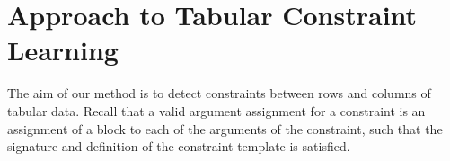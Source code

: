 %







\newcommand{\tcl}{Tabular Constraint Learning}
\section{Approach to Tabular Constraint Learning}\label{sec:approach}
The aim of our method is to detect constraints between rows and columns of tabular data. Recall that a valid argument assignment for a constraint is an assignment of a block to each of the arguments of the constraint, such that the signature and definition of the constraint template is satisfied.

